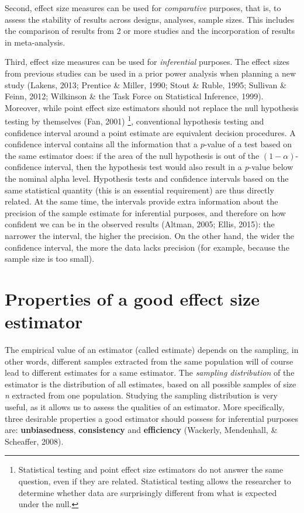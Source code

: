 \documentclass[
  english,
  man,floatsintext]{apa6}
\begin{document}
Second, effect size measures can be used for \emph{comparative} purposes, that is, to assess the stability of results across designs, analyses, sample sizes. This includes the comparison of results from 2 or more studies and the incorporation of results in meta-analysis.

Third, effect size measures can be used for \emph{inferential} purposes. The effect sizes from previous studies can be used in a prior power analysis when planning a new study (Lakens, 2013; Prentice \& Miller, 1990; Stout \& Ruble, 1995; Sullivan \& Feinn, 2012; Wilkinson \& the Task Force on Statistical Inference, 1999). Moreover, while point effect size estimators should not replace the null hypothesis testing by themselves (Fan, 2001) \footnote{Statistical testing and point effect size estimators do not answer the same question, even if they are related. Statistical testing allows the researcher to determine whether data are surprisingly different from what is expected under the null.}, conventional hypothesis testing and confidence interval around a point estimate are equivalent decision procedures. A confidence interval contains all the information that a \(p\)-value of a test based on the same estimator does: if the area of the null hypothesis is out of the \((1-\alpha)\)-confidence interval, then the hypothesis test would also result in a \emph{p}-value below the nominal alpha level. Hypothesis tests and confidence intervals based on the same statistical quantity (this is an essential requirement) are thus directly related. At the same time, the intervals provide extra information about the precision of the sample estimate for inferential purposes, and therefore on how confident we can be in the observed results (Altman, 2005; Ellis, 2015): the narrower the interval, the higher the precision. On the other hand, the wider the confidence interval, the more the data lacks precision (for example, because the sample size is too small).

\hypertarget{properties-of-a-good-effect-size-estimator}{%
\section{Properties of a good effect size estimator}\label{properties-of-a-good-effect-size-estimator}}

The empirical value of an estimator (called estimate) depends on the sampling, in other words, different samples extracted from the same population will of course lead to different estimates for a same estimator. The \emph{sampling distribution} of the estimator is the distribution of all estimates, based on all possible samples of size \emph{n} extracted from one population. Studying the sampling distribution is very useful, as it allows us to assess the qualities of an estimator. More specifically, three desirable properties a good estimator should possess for inferential purposes are: \textbf{unbiasedness}, \textbf{consistency} and \textbf{efficiency} (Wackerly, Mendenhall, \& Scheaffer, 2008).
\end{document}
